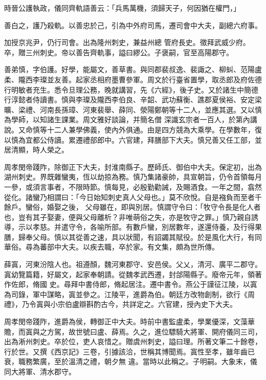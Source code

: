 \begin{pinyinscope}
 時晉公護執政，儀同齊軌語善云：「兵馬萬機，須歸天子，何因猶在權門，」



 善白之，護乃殺軌。以善忠於己，引為中外府司馬，遷司會中大夫，副總六府事。



 加授京兆尹，仍行司會。出為隆州刺史，兼益州總
 管府長史。徵拜武威少府。卒，贈三州刺史。帝以善告齊軌事，謚曰繆公。子褒嗣，官至高陽郡守。



 善弟慎，字伯護。好學，能屬文，善草書。與同郡裴叔逸、裴諏之、柳虯、范陽盧柔、隴西李璨並友善。起家丞相府墨曹參軍。周文於行臺省置學，取丞郎及府佐德行明敏者充生。悉令旦理公務，晚就講習，先《六經》，後子史。又於諸生中簡德行淳懿者侍讀書。慎與李璨及隴西李伯良、辛韶、武功蘇衡、譙郡夏侯裕、安定梁曠、梁禮、河南長孫璋、河東裴舉、薛同、滎陽鄭朝等十二人，並應其選。又以慎為學師，以知諸生課業。周文雅好談論，并簡名僧
 深識玄宗者一百人，於第內講說。又命慎等十二人兼學佛義，使內外俱通。由是四方競為大乘學。在學數年，復以慎為宜都公侍讀。累遷禮部郎中。六官建，拜膳部下大夫。慎兄善又任工部，並居清顯，時人榮之。



 周孝閔帝踐阼，除御正下大夫，封淮南縣子。歷師氏、御伯中大夫。保定初，出為湖州刺史。界既雜蠻夷，恆以劫掠為務。慎乃集諸豪帥，具宣朝旨，仍令首領每月一參，或須言事者，不限時節。慎每見，必殷勤勸誡，及賜酒食。一年之間，翕然從化。諸蠻乃相謂曰：「今日始知刺史真人父母也。」莫不欣悅。自是襁負而至者千餘戶。蠻俗，婚娶之後，
 父母雖在，即與別居。慎謂守令曰：「牧守令長是化人者也，豈有其子娶妻，便與父母離析？非唯萌俗之失，亦是牧守之罪。」慎乃親自誘導，示以孝慈。并遣守令，各喻所部。有數戶蠻，別居數年，遂還侍養，及行得果膳，歸奉父母。慎以其從善之速，具以狀聞，有詔蠲其賦役。於是風化大行，有同華俗。尋為蕃部中大夫。以疾去職，卒於家。有文集，頗為世所傳。



 薛寘，河東汾陰人也。祖遵顏，魏河東郡守、安邑侯。父乂，清河、廣平二郡守。寘幼覽篇籍，好屬文，起家奉朝請。從魏孝武西遷，封郃陽縣子。廢帝元年，領著作佐郎，脩國
 史。尋拜中書侍郎，脩起居注。遷中書令。燕公于謹征江陵，以寘為司錄，軍中謀略，寘並參之。江陵平，進爵為伯。朝廷方改物創制，欲行《周禮》，乃令寘與小宗伯盧辯斟酌古今，共詳定之。六官建，授內史下大夫。



 周孝閔帝踐阼，進爵為侯，轉御正中大夫。時前中書監盧柔，學業優深，文藻華贍，而寘與之方駕，故世號曰盧、薛焉。久之，進位驃騎大將軍、開府儀同三司，出為淅州刺史。卒於位，吏人哀惜之。贈虞州刺史，謚曰理。所著文筆二十餘卷，行於世。又撰《西京記》三卷，引據該洽，世稱其博聞焉。寘性至孝，雖年齒已衰，職務繁廣，至於溫清之禮，朝夕無
 違。當時以此稱之。子明嗣。大象末，儀同大將軍、清水郡守。



\end{pinyinscope}
